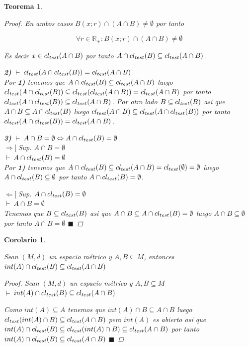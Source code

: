 \documentclass[oneside]{book} %
\theoremstyle{Teorema}
\newtheorem{Teorema}[Definicion]{Teorema}
\newtheorem{Corolario}[Definicion]{Corolario}
\theoremstyle{Ejemplos}
\theoremstyle{[Obs]}
\def \test {test}
\newcommand{\cerradura}[2][\test]{\ifx \test #1 {\overline{#2}} \else {cl_{#1}(#2)} \fi} %
\renewcommand{\{}{\left\lbrace} %
\renewcommand{\}}{\right\rbrace} %
\newcommand{\n}{\cap} %
\renewcommand{\sc}{\subseteq} %
\newcommand{\R}{\mathbb{R}} %
\renewcommand{\qed}{$\blacksquare$} %
\newcommand{\pd}{$\vdash\ $} %
\newcommand{\necesidad}{$\Rightarrow]\ $} %
\newcommand{\suficiencia}{$\Leftarrow]\ $} %
\begin{document}
\begin{Teorema}
\begin{proof}
					En ambos casos $B(x;r) \n (A \n B) \neq \emptyset$ por tanto 

					\[ \forall r \in \R_{+} : B(x;r) \n (A \n B) \neq \emptyset \]

					Es decir $x \in \cerradura{A \n B}$ por tanto $A \n \cerradura{B} \sc \cerradura{A \n B}$.

					\textbf{2)} \pd $\cerradura{A \n \cerradura{B}} = \cerradura{A \n B}$ \\ 
					Por \textbf{1)} tenemos que $A \n \cerradura{B} \sc \cerradura{A \n B}$ luego $\cerradura{A \n \cerradura{B}} \sc \cerradura{\cerradura{A \n B}} = \cerradura{A \n B}$ por tanto $\cerradura{A \n \cerradura{B}} \sc \cerradura{A \n B}$. Por otro lado $B \sc \cerradura{B}$ asi que $A \n B \sc A \n \cerradura{B}$ luego $\cerradura{A \n B} \sc \cerradura{A \n \cerradura{B}}$ por tanto $\cerradura{A \n \cerradura{B}} = \cerradura{A \n B}$.

					\textbf{3)} \pd $A \n B = \emptyset \Leftrightarrow A \n \cerradura{B} = \emptyset$ \\ 
					\necesidad Sup. $A \n B = \emptyset$ \\ 
					\pd $A \n \cerradura{B} = \emptyset$ \\ 
					Por \textbf{1)} tenemos que $A \n \cerradura{B} \sc \cerradura{A \n B} = \cerradura{\emptyset} = \emptyset$ luego $A \n \cerradura{B} \sc \emptyset$ por tanto $A \n \cerradura{B} = \emptyset$. 

					\suficiencia Sup. $A \n \cerradura{B} = \emptyset$ \\ 
					\pd $A \n B = \emptyset$ \\
					Tenemos que $B \sc \cerradura{B}$ asi que $A \n B \sc A \n \cerradura{B} = \emptyset$ luego $A \n B \sc \emptyset$ por tanto $A \n B = \emptyset$ \qed

				\end{proof}
			
			\end{Teorema}

			\begin{Corolario}\label{Corolario: Interseccion de interior y cerradura}\setlength{\parindent}{0em}
			
				Sean $(M, d)$ un espacio métrico y $A, B \sc M$, entonces $int(A) \n \cerradura{B} \sc \cerradura{A \n B}$

				\begin{proof}
					
					Sean $(M, d)$ un espacio métrico y $A, B \sc M$ \\ 
					\pd $int(A) \n \cerradura{B} \sc \cerradura{A \n B}$

					Como $int(A) \sc A$ tenemos que $int(A) \n B \sc A \n B$ luego $\cerradura{int(A) \n B} \sc \cerradura{A \n B}$ pero $int(A)$ es abierto asi que $int(A) \n \cerradura{B} \sc \cerradura{int(A) \n B} \sc \cerradura{A \n B}$ por tanto $int(A) \n \cerradura{B} \sc \cerradura{A \n B}$ \qed

				\end{proof}
			
			\end{Corolario}
\end{document}
